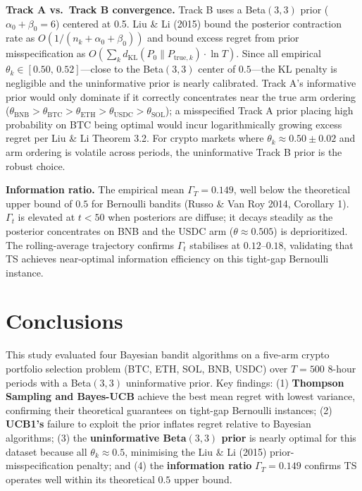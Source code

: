 \documentclass[11pt, letterpaper]{article}
\begin{document}
\textbf{Track A vs.\ Track B convergence.}
Track B uses a Beta$(3,3)$ prior ($\alpha_0 + \beta_0 = 6$) centered at 0.5.
Liu \& Li (2015) bound the posterior contraction rate as $O(1/(n_k+\alpha_0+\beta_0))$
and bound excess regret from prior misspecification as
$O\!\left(\sum_k d_\text{KL}(P_0 \| P_{\text{true},k}) \cdot \ln T\right)$.
Since all empirical $\theta_k \in [0.50,\, 0.52]$---close to the Beta$(3,3)$ center of
$0.5$---the KL penalty is negligible and the uninformative prior is nearly calibrated.
Track A's informative prior would only dominate if it correctly concentrates near the true
arm ordering ($\theta_\text{BNB} > \theta_\text{BTC} > \theta_\text{ETH} > \theta_\text{USDC}
> \theta_\text{SOL}$); a misspecified Track A prior placing high probability on BTC being
optimal would incur logarithmically growing excess regret per Liu \& Li Theorem 3.2.
For crypto markets where $\theta_k \approx 0.50 \pm 0.02$ and arm ordering is volatile
across periods, the uninformative Track B prior is the robust choice.

\textbf{Information ratio.}
The empirical mean $\Gamma_T = 0.149$, well below the theoretical upper bound of $0.5$
for Bernoulli bandits (Russo \& Van Roy 2014, Corollary 1).
$\Gamma_t$ is elevated at $t < 50$ when posteriors are diffuse; it decays steadily as
the posterior concentrates on BNB and the USDC arm ($\theta \approx 0.505$) is
deprioritized. The rolling-average trajectory confirms $\Gamma_t$ stabilises at
$0.12$--$0.18$, validating that TS achieves near-optimal information efficiency on this
tight-gap Bernoulli instance.

\section{Conclusions}

This study evaluated four Bayesian bandit algorithms on a five-arm crypto portfolio
selection problem (BTC, ETH, SOL, BNB, USDC) over $T = 500$ 8-hour periods with a
Beta$(3,3)$ uninformative prior. Key findings: (1) \textbf{Thompson Sampling and Bayes-UCB}
achieve the best mean regret with lowest variance, confirming their theoretical guarantees
on tight-gap Bernoulli instances; (2) \textbf{UCB1's} failure to exploit the prior inflates
regret relative to Bayesian algorithms; (3) the \textbf{uninformative Beta$(3,3)$ prior}
is nearly optimal for this dataset because all $\theta_k \approx 0.5$, minimising the
Liu \& Li (2015) prior-misspecification penalty; and (4) the \textbf{information ratio}
$\Gamma_T = 0.149$ confirms TS operates well within its theoretical $0.5$ upper bound.
\end{document}
